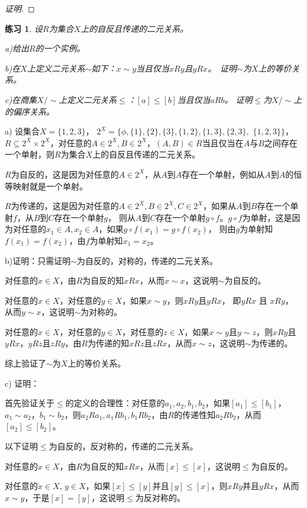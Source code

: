 \documentclass{book}[oneside]
\newtheorem{Exercise}{练习}[chapter]
\begin{document}
\begin{CJK*}{UTF8}{gbsn}
\begin{proof}[证明]
\end{proof}
\begin{Exercise}
  设$R$为集合$X$上的自反且传递的二元关系。

a)给出$R$的一个实例。

b)在$X$上定义二元关系$\sim$如下：$x\sim y$当且仅当$x R y$且$y R x$。　证明$\sim$为$X$上的等价关系。

c)在商集$X/\sim$上定义二元关系$\leq$：$[a]\leq [b]$当且仅当$aRb$。
证明$\leq$为$X/\sim$上的偏序关系。  
\end{Exercise}
 a) 设集合$X=\{1,2,3\}$，
$2^X=\{\phi,\{1\},\{2\},\{3\},\{1,2\},\{1,3\},\{2,3\},$ $\{1,2,3\}\}$，
$R\subseteq 2^X\times 2^X$，对任意的$A\in 2^X,B\in 2^X$，$(A,B)\in R$当且仅当在$A$与$B$之间存在一个单射，则$R$为集合$X$上的自反且传递的二元关系。

$R$为自反的，这是因为对任意的$A\in 2^X$，从$A$到$A$存在一个单射，例如从$A$到$A$的恒等映射就是一个单射。

$R$为传递的，这是因为对任意的$A\in 2^X, B\in 2^X, C\in 2^X$，如果从$A$到$B$存在一个单射$f$，从$B$到$C$存在一个单射$g$，
则从$A$到$C$存在一个单射$g\circ f$。$g\circ f$为单射，这是因为对任意的$x_1\in A,x_2\in A$，如果$g\circ f(x_1)=g\circ f(x_2)$，
则由$g$为单射知$f(x_1)=f(x_2)$，由$f$为单射知$x_1=x_2$。

b)证明：只需证明$\sim$为自反的，对称的，传递的二元关系。

  对任意的$x\in X$，由$R$为自反的知$xRx$，从而$x\sim x$，这说明$\sim$为自反的。

  对任意的$x\in X$，对任意的$y\in X$，如果$x\sim y$，则$xRy$且$yRx$， 
  即$yRx$ 且 $xRy$， 从而$y\sim x$，这说明$\sim$为对称的。

  对任意的$x\in X$，对任意的$y\in X$，对任意的$z\in X$，如果$x\sim y$且$y\sim z$，则$xRy$且$yRx$，$yRz$且$zRy$，由$R$为传递的知$xRz$且$zRx$，从而$x\sim z$，这说明$\sim$为传递的。

  综上验证了$\sim$为$X$上的等价关系。

  c) 证明：

首先验证关于$\leq$的定义的合理性：对任意的$a_1,a_2,b_1,b_2$，如果$[a_1]\leq [b_1]$，
$a_1\sim a_2$，$b_1\sim b_2$，则$a_2 R a_1, a_1 R b_1, b_1 R b_2$，由$R$的传递性知$a_2 R b_2$，从而$[a_2]\leq [b_2]$。

以下证明$\leq$为自反的，反对称的，传递的二元关系。

  对任意的$x\in X$，由$R$为自反的知$xRx$，从而$[x]\leq [x]$，这说明$\leq$为自反的。

  对任意的$x\in X$, $y\in X$，如果$[x]\leq [y]$并且$[y]\leq [x]$，则$xRy$并且$yRx$，从而$x\sim y$，于是$[x]=[y]$，这说明$\leq$为反对称的。


\end{CJK*}
\end{document}

